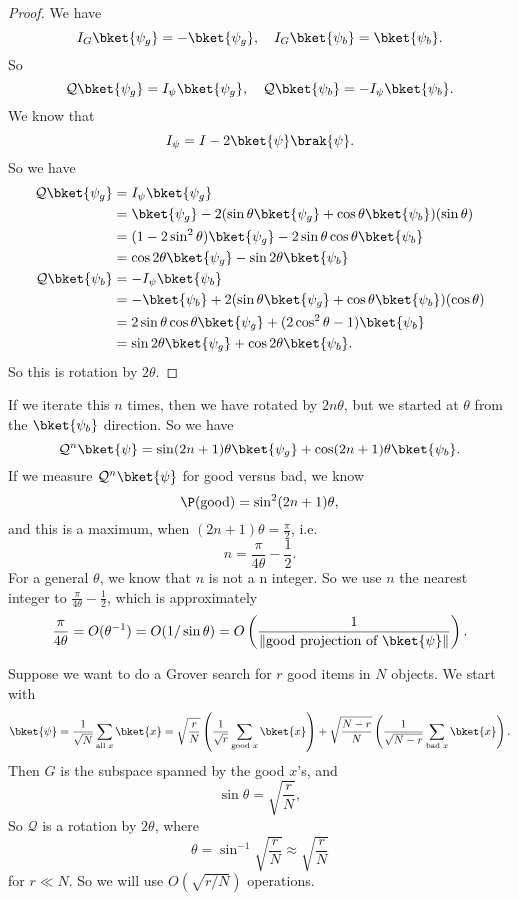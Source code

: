 \documentclass[a4paper]{article}
\begin{document}
\begin{proof}
  We have
  \[
    I_G \bket{\psi_g} = - \bket{\psi_g},\quad I_G \bket{\psi_b} = \bket{\psi_b}.
  \]
  So
  \[
    \mathcal{Q} \bket{\psi_g} = I_\psi \bket{\psi_g}, \quad \mathcal{Q} \bket{\psi_b} = - I_\psi \bket{\psi_b}.
  \]
  We know that
  \[
    I_\psi = I - 2\bket{\psi}\brak{\psi}.
  \]
  So we have
  \begin{align*}
    \mathcal{Q} \bket{\psi_g} &= I_\psi \bket{\psi_g}\\
    &= \bket{\psi_g} - 2(\sin \theta \bket{\psi_g} + \cos \theta \bket{\psi_b})(\sin \theta)\\
    &= (1 - 2 \sin^2 \theta) \bket{\psi_g} - 2 \sin \theta \cos \theta \bket{\psi_b}\\
    &= \cos 2\theta \bket{\psi_g} - \sin 2\theta \bket{\psi_b}\\
    \mathcal{Q} \bket{\psi_b} &= - I_\psi \bket{\psi_b}\\
    &= -\bket{\psi_b} + 2(\sin \theta \bket{\psi_g} + \cos \theta \bket{\psi_b})(\cos \theta)\\
    &= 2 \sin \theta \cos \theta \bket{\psi_g} + (2\cos^2 \theta - 1) \bket{\psi_b}\\
    &= \sin 2 \theta \bket{\psi_g} + \cos 2 \theta \bket{\psi_b}.
  \end{align*}
  So this is rotation by $2 \theta$.
\end{proof}

If we iterate this $n$ times, then we have rotated by $2n \theta$, but we started at $\theta$ from the $\bket{\psi_b}$ direction. So we have
\[
  \mathcal{Q}^n \bket{\psi} = \sin (2n + 1) \theta \bket{\psi_g} + \cos (2n + 1) \theta \bket{\psi_b}.
\]
If we measure $\mathcal{Q}^n\bket{\psi}$ for good versus bad, we know
\[
  \P(\text{good}) = \sin^2 (2n + 1)\theta,
\]
and this is a maximum, when $(2n + 1) \theta = \frac{\pi}{2}$, i.e.
\[
  n = \frac{\pi}{4 \theta} - \frac{1}{2}.
\]
For a general $\theta$, we know that $n$ is not a n integer. So we use $n$ the nearest integer to $\frac{\pi}{4 \theta} - \frac{1}{2}$, which is approximately
\[
  \frac{\pi}{4 \theta} = O(\theta^{-1}) = O(1/\sin \theta) = O\left(\frac{1}{\|\text{good projection of }\bket{\psi}\|}\right).
\]

\begin{eg}
  Suppose we want to do a Grover search for $r$ good items in $N$ objects. We start with
  \[
    \bket{\psi} = \frac{1}{\sqrt{N}} \sum_{\text{all }x} \bket{x} = \sqrt{\frac{r}{N}}\left(\frac{1}{\sqrt{r}} \sum_{\text{good }x} \bket{x}\right) + \sqrt{\frac{N - r}{N}}\left(\frac{1}{\sqrt{N - r}} \sum_{\text{bad }x} \bket{x}\right).
  \]
  Then $G$ is the subspace spanned by the good $x$'s, and
  \[
    \sin \theta =\sqrt{\frac{r}{N}},
  \]
  So $\mathcal{Q}$ is a rotation by $2\theta$, where
  \[
    \theta = \sin^{-1}\sqrt{\frac{r}{N}} \approx \sqrt{\frac{r}{N}}
  \]
  for $r \ll N$. So we will use $O(\sqrt{r/N})$ operations.
\end{eg}
\end{document}
